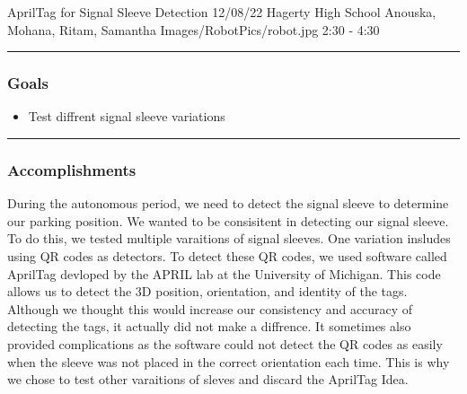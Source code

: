 \insertmeeting 
	{AprilTag for Signal Sleeve Detection} 
	{12/08/22}
	{Hagerty High School}
	{Anouska, Mohana, Ritam, Samantha}
	{Images/RobotPics/robot.jpg}
	{2:30 - 4:30}
	
\noindent\hfil\rule{\textwidth}{.4pt}\hfil
\subsubsection*{Goals}
\begin{itemize}
    \item Test diffrent signal sleeve variations

\end{itemize} 

\noindent\hfil\rule{\textwidth}{.4pt}\hfil

\subsubsection*{Accomplishments}
During the autonomous period, we need to detect the signal sleeve to determine our parking position. We wanted to be consisitent in detecting our signal sleeve. To do this, we tested multiple varaitions of signal sleeves. One variation insludes using QR codes as detectors. To detect these QR codes, we used software called AprilTag devloped by the APRIL lab at the University of Michigan. This code allows us to detect the 3D position, orientation, and identity of the tags. Although we thought this would increase our consistency and accuracy of detecting the tags, it actually did not make a diffrence. It sometimes also provided complications as the software could not detect the QR codes as easily when the sleeve was not placed in the correct orientation each time. This is why we chose to test other varaitions of sleves and discard the AprilTag Idea. 

